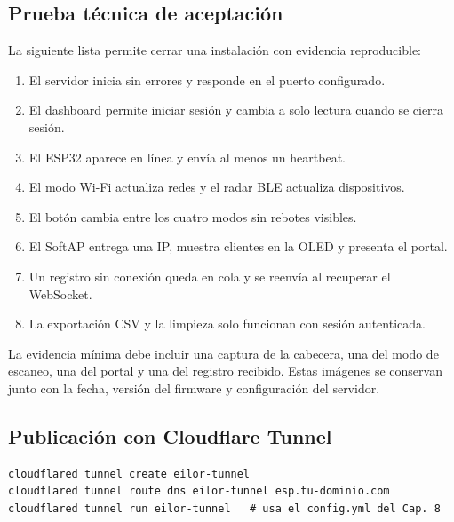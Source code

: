 \subsection{Prueba técnica de aceptación}
La siguiente lista permite cerrar una instalación con evidencia reproducible:
\begin{enumerate}[leftmargin=1.8em]
  \item El servidor inicia sin errores y responde en el puerto configurado.
  \item El dashboard permite iniciar sesión y cambia a solo lectura cuando se cierra sesión.
  \item El ESP32 aparece en línea y envía al menos un heartbeat.
  \item El modo Wi\nobreakdash-Fi actualiza redes y el radar BLE actualiza dispositivos.
  \item El botón cambia entre los cuatro modos sin rebotes visibles.
  \item El SoftAP entrega una IP, muestra clientes en la OLED y presenta el portal.
  \item Un registro sin conexión queda en cola y se reenvía al recuperar el WebSocket.
  \item La exportación CSV y la limpieza solo funcionan con sesión autenticada.
\end{enumerate}

La evidencia mínima debe incluir una captura de la cabecera, una del modo de
escaneo, una del portal y una del registro recibido. Estas imágenes se conservan
junto con la fecha, versión del firmware y configuración del servidor.

\subsection{Publicación con Cloudflare Tunnel}
\begin{lstlisting}[style=bash,caption={Publicación del servicio con cloudflared},basicstyle=\ttfamily\footnotesize]
cloudflared tunnel create eilor-tunnel
cloudflared tunnel route dns eilor-tunnel esp.tu-dominio.com
cloudflared tunnel run eilor-tunnel   # usa el config.yml del Cap. 8
\end{lstlisting}

